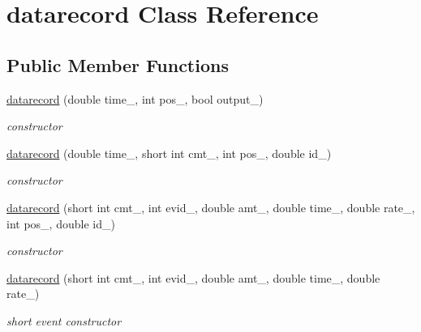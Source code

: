 \hypertarget{classdatarecord}{}\section{datarecord Class Reference}
\label{classdatarecord}
\subsection*{Public Member Functions}
\begin{DoxyCompactItemize}
\item 
\mbox{\label{classdatarecord_a57566eae869dfb8e813c10670852ec07}} 
\hyperlink{classdatarecord_a57566eae869dfb8e813c10670852ec07}{datarecord} (double time\+\_\+, int pos\+\_\+, bool output\+\_\+)
\begin{DoxyCompactList}\small\item\em constructor \end{DoxyCompactList}\item 
\mbox{\label{classdatarecord_a73f77d80f8b614d6ce41ef4958e94bc4}} 
\hyperlink{classdatarecord_a73f77d80f8b614d6ce41ef4958e94bc4}{datarecord} (double time\+\_\+, short int cmt\+\_\+, int pos\+\_\+, double id\+\_\+)
\begin{DoxyCompactList}\small\item\em constructor \end{DoxyCompactList}\item 
\mbox{\label{classdatarecord_ad07f800501f2c89627c1a3ddcb107077}} 
\hyperlink{classdatarecord_ad07f800501f2c89627c1a3ddcb107077}{datarecord} (short int cmt\+\_\+, int evid\+\_\+, double amt\+\_\+, double time\+\_\+, double rate\+\_\+, int pos\+\_\+, double id\+\_\+)
\begin{DoxyCompactList}\small\item\em constructor \end{DoxyCompactList}\item 
\mbox{\label{classdatarecord_a9bef6b545a4272423d4184271a9446a3}} 
\hyperlink{classdatarecord_a9bef6b545a4272423d4184271a9446a3}{datarecord} (short int cmt\+\_\+, int evid\+\_\+, double amt\+\_\+, double time\+\_\+, double rate\+\_\+)
\begin{DoxyCompactList}\small\item\em short event constructor \end{DoxyCompactList}\item 

\end{DoxyCompactItemize}

